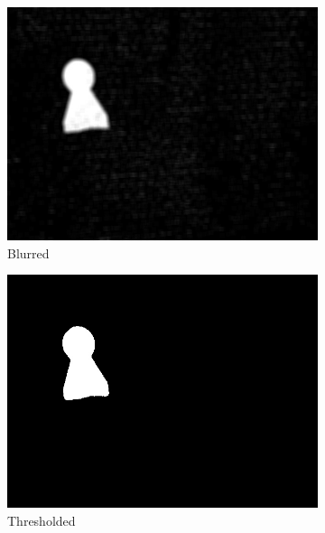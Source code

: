 \begin{figure}
\begin{subfigure}[b]{0.48\linewidth}
    \includegraphics[width=\linewidth]{img/simple_background/blurring.jpg}
    \caption{Blurred}
  \end{subfigure}
  \begin{subfigure}[b]{0.48\linewidth}
    \includegraphics[width=\linewidth]{img/simple_background/second-thresh.jpg}
    \caption{Thresholded}
    \label{fig:simple-background-second-threshold}
  \end{subfigure}
  \begin{subfigure}[b]{0.48\linewidth}

\end{subfigure}
\end{figure}
